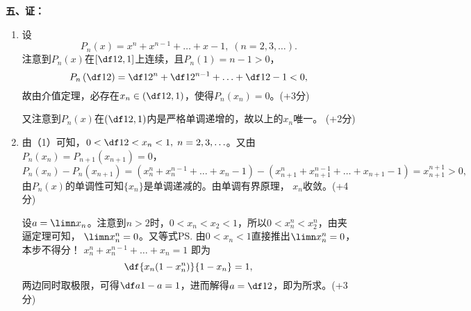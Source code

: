 {\bf 五、证：}
\begin{enumerate}[(1)]
  \setlength{\itemindent}{1cm}
  \item 设
  $$P_n(x)=x^n+x^{n-1}+\ldots+x-1,\;(n=2,3,\ldots).$$
  注意到$P_n(x)$在$\left[\df12,1\right]$上连续，且$P_n(1)=n-1>0$，
  $$P_n\left(\df12\right)=\df1{2^n}+\df1{2^{n-1}}+\ldots+\df12-1<0,$$
  故由介值定理，必存在$x_n\in\left(\df12,1\right)$，使得$P_n(x_n)=0$。\hfill{{(+3分)}}
  
  又注意到$P_n(x)$在$\left(\df12,1\right)$内是严格单调递增的，故以上的$x_n$唯一。
  \hfill{{(+2分)}}
  \item 由（1）可知，$0<\df12<x_n<1,\;n=2,3,\ldots$。又由$P_n(x_n)=
  P_{n+1}(x_{n+1})=0$，
  $$P_n(x_n)-P_n(x_{n+1})=(x_n^n+x_n^{n-1}+\ldots+x_n-1)
  -(x_{n+1}^n+x_{n+1}^{n-1}+\ldots+x_{n+1}-1)=x_{n+1}^{n+1}>0,$$
  由$P_n(x)$的单调性可知$\{x_n\}$是单调递减的。由单调有界原理，
  ${x_n}$收敛。\hfill{{(+4分)}}
  
  设$a=\limn x_n$。注意到$n>2$时，$0<x_n<x_2<1$，所以$0<x_n^n<x_2^n$，由夹逼定理可知，
  $\limn x_n^n=0$。又等式\ps{由$0<x_n<1$直接推出$\limn x_n^n=0$，本步不得分！}
  $x_n^n+x_n^{n-1}+\ldots+x_n=1$
  即为
  $$\df{x_n(1-x_n^n)}{1-x_n}=1,$$
  两边同时取极限，可得$\df a{1-a}=1$，进而解得$a=\df12$，即为所求。\hfill{{(+3分)}}
 \end{enumerate}
 
% 
% 

